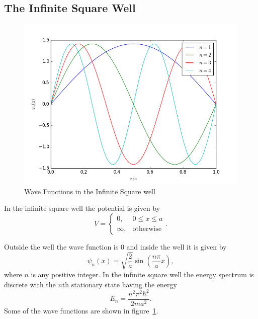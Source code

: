\documentclass[12pt,a4paper]{article}
\begin{document}
\subsection{The Infinite Square Well}
\begin{figure}
\includegraphics[width=\textwidth]{../Python/ISW_stationarySolutions.png}
\caption{Wave Functions in the Infinite Square well}
\label{fig:infiniteSquareWell}
\end{figure}

In the infinite square well the potential is given by
\begin{equation}
V = \begin{cases} 0, & 0 \leq x \leq a \\
                  \infty, & \text{otherwise} \end{cases}.
\end{equation}

Outside the well the wave function is $0$ and inside the well it is given by
\begin{equation}
\psi_n(x) = \sqrt{\frac{2}{a}} \sin \left( \frac{n \pi}{a} x \right),
\end{equation}
where $n$ is any positive integer. In the infinite square well the energy spectrum is discrete with the $n$th stationary state having the energy
\begin{equation}
E_n = \frac{n^2 \pi^2 \hbar^2}{2 m a^2}.
\end{equation}
Some of the wave functions are shown in figure~\ref{fig:infiniteSquareWell}.
\end{document}
